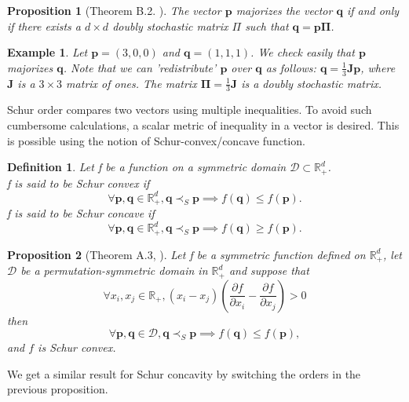 \documentclass[twoside,11pt]{book}
\newtheorem{proposition}{Proposition}
\newtheorem{definition}{Definition}
\newtheorem{example}{Example}
\numberwithin{theorem}{chapter}
\numberwithin{definition}{chapter}
\numberwithin{proposition}{chapter}
\numberwithin{corollary}{chapter}
\numberwithin{example}{chapter}
\numberwithin{lemma}{chapter}
\numberwithin{assumption}{chapter}
\numberwithin{equation}{chapter}
\numberwithin{figure}{chapter}
\begin{document}
\begin{subappendices}
\begin{proposition}[Theorem B.2. \citealp{MaOlAr11}]
The vector $\bm{p}$ majorizes the vector $\bm{q}$ if and only if there exists a $d \times d$ doubly stochastic matrix $\Pi$ such that $\bm{q} = \bm{p \Pi}$.
\end{proposition}
\begin{example}
Let $\bm{p} = (3,0,0)$ and $\bm{q} = (1,1,1)$.
We check easily that $\bm{p}$ majorizes $\bm{q}$. Note that we can 'redistribute' $\bm{p}$ over $\bm{q}$ as follows: $\bm{q} =\frac{1}{3} \bm{J} \bm{p}$, where $\bm{J}$ is a $3 \times 3$ matrix of ones. The matrix $\bm{\Pi}=\frac{1}{3}\bm{J}$ is a doubly stochastic matrix.
\end{example}
Schur order compares two vectors using multiple inequalities. To avoid such cumbersome calculations, a scalar metric of inequality in a vector is desired. This is possible using the notion of Schur-convex/concave function.

\begin{definition}
Let f be a function on a symmetric domain $\mathcal{D} \subset \mathbb{R}_{+}^{d}$.\\
f is said to be Schur convex if
\begin{equation}
    \forall \bm{p}, \bm{q} \in \mathbb{R}_{+}^{d}, \bm{q} \prec_{S} \bm{p} \implies f(\bm{q}) \leq f(\bm{p}).
\end{equation}
f is said to be Schur concave if
\begin{equation}
    \forall \bm{p}, \bm{q} \in \mathbb{R}_{+}^{d}, \bm{q} \prec_{S} \bm{p} \implies f(\bm{q}) \geq f(\bm{p}).
\end{equation}
\end{definition}


\begin{proposition}[Theorem A.3, \citealp{MaOlAr11}]\label{schur_order_partial_property}
Let f be a symmetric function defined on $\mathbb{R}_{+}^{d}$, let $\mathcal{D}$ be a permutation-symmetric domain in $\mathbb{R}_{+}^{d}$ and suppose that
\begin{equation}
\forall x_{i},x_{j} \in \mathbb{R}_{+},   (x_{i} - x_{j}) (\frac{\partial f}{\partial x_{i}} - \frac{\partial f}{\partial x_{j}}) >0 
\end{equation}
then
\begin{equation}
    \forall \bm{p}, \bm{q} \in \mathcal{D}, \bm{q} \prec_{S} \bm{p} \implies f(\bm{q}) \leq f(\bm{p}),
\end{equation}
and $f$ is Schur convex.
\end{proposition}
We get a similar result for Schur concavity by switching the orders in the previous proposition. 


\end{subappendices}
\end{document}
